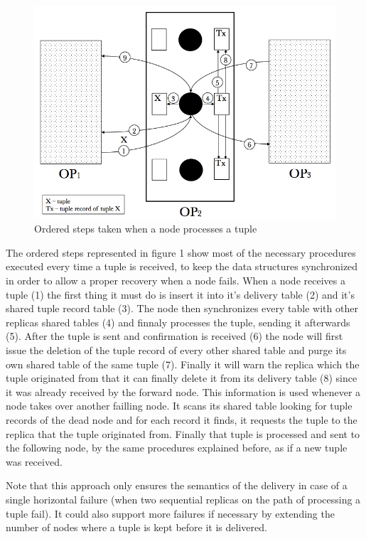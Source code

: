 \documentclass[times, 10pt,twocolumn]{article}
\begin{document}

\begin{figure}[h] \includegraphics[width=\columnwidth]{semantics}
	\caption{Ordered steps taken when a node processes a tuple} \end{figure}

The ordered steps represented in figure 1 show most of the necessary
procedures executed every time a tuple is received, to keep the data
structures synchronized in order to allow a proper recovery when a node
fails. When a node receives a tuple (1) the first thing it must do is
insert it into it's delivery table (2) and it's shared tuple record table
(3). The node then synchronizes every table with other replicas shared
tables (4) and finnaly processes the tuple, sending it afterwards (5).
After the tuple is sent and confirmation is received (6) the node will
first issue the deletion of the tuple record of every other shared table
and purge its own shared table of the same tuple (7). Finally it will warn
the replica which the tuple originated from that it can finally delete it
from its delivery table (8) since it was already received by the forward
node. This information is used whenever a node takes over another failling
node. It scans its shared table looking for tuple records of the dead node
and for each record it finds, it requests the tuple to the replica that
the tuple originated from. Finally that tuple is processed and sent to the
following node, by the same procedures explained before, as if a new tuple
was received. 

Note that this approach only ensures the semantics of the delivery in case
of a single horizontal failure (when two sequential replicas on the path
of processing a tuple fail). It could also support more failures if
necessary by extending the number of nodes where a tuple is kept before it
is delivered.
\end{document}
